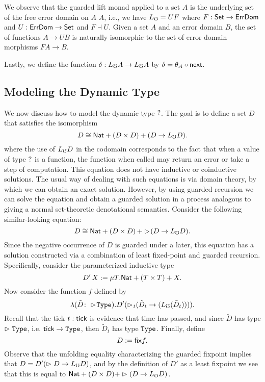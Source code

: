 We observe that the guarded lift monad applied to a set $A$ is the underlying
set of the free error domain on $A$ $A$, i.e., we have $L_\mho = UF$ where $F :
\mathsf{Set} \to \textsf{ErrDom}$ and $U : \textsf{ErrDom} \to \mathsf{Set}$ and $F \dashv U$. Given a set $A$
and an error domain $B$, the set of functions $A \to UB$ is naturally isomorphic
to the set of error domain morphisms $FA \to B$.

Lastly, we define the function $\delta : L_\mho A \to L_\mho A$ by $\delta = \theta_A
\circ \mathsf{next}$.



\subsection{Modeling the Dynamic Type}\label{sec:dynamic-type}

We now discuss how to model the dynamic type $?$.
The goal is to define a set $D$ that satisfies the isomorphism
%
\[ D \cong \mathsf{Nat} + (D \times D) + (D \to L_\mho D). \]
%
where the use of $L_\mho D$ in the codomain corresponds to the fact that when a
value of type $?$ is a function, the function when called may return an error
or take a step of computation. This equation does not have inductive or
coinductive solutions. The usual way of dealing with such equations is via
domain theory, by which we can obtain an exact solution. However, by using
guarded recursion we can solve the equation and obtain a guarded solution in a
process analogous to giving a normal set-theoretic denotational semantics.
Consider the following similar-looking equation:
%
\[ D \cong \mathsf{Nat} + (D \times D)\, + \vartriangleright \hspace{-0.2em} (D \to L_\mho D). \]
%
Since the negative occurrence of $D$ is guarded under a later, this equation has
a solution constructed via a combination of least fixed-point and guarded
recursion. Specifically, consider the parameterized inductive type
%
\[ D'\, X := \mu T. \mathsf{Nat} + (T \times T) + X. \]
%
Now consider the function $f$ defined by
%
\[ \lambda (\tilde{D} \colon \vartriangleright \hspace{-0.2em} \texttt{Type}) . D' (\vartriangleright \hspace{-0.2em}_t (\tilde{D}_t \to (L_\mho (\tilde{D}_t)))). \]
%
Recall that the tick $t : \mathsf{tick}$ is evidence that time has passed, and since
$\tilde{D}$ has type $\vartriangleright \texttt{Type}$, i.e. $\mathsf{tick} \to \texttt{Type}$, then $\tilde{D}_t$
has type $\texttt{Type}$.
%
Finally, define 
\[ D := \mathsf{fix} f. \]
%
Observe that the unfolding equality characterizing the guarded fixpoint implies
that $D = D' (\vartriangleright D \to L_\mho D)$, and by the definition of $D'$ as a least
fixpoint we see that this is equal to $\mathsf{Nat} + (D \times D) + \vartriangleright (D \to L_\mho
D)$.


